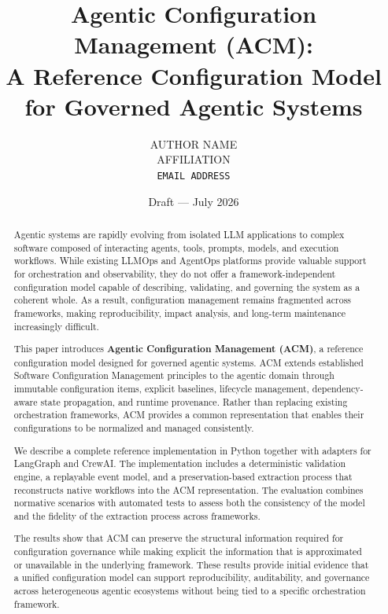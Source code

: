 \documentclass[10pt]{article}
\title{\textbf{Agentic Configuration Management (ACM):\\A Reference Configuration Model for Governed Agentic Systems}}
\author{
  AUTHOR NAME\\
  AFFILIATION\\
  \texttt{EMAIL ADDRESS}
}
\date{Draft --- July 2026}
\begin{document}
\maketitle

\begin{abstract}

Agentic systems are rapidly evolving from isolated LLM applications to complex software composed of interacting agents, tools, prompts, models, and execution workflows. While existing LLMOps and AgentOps platforms provide valuable support for orchestration and observability, they do not offer a framework-independent configuration model capable of describing, validating, and governing the system as a coherent whole. As a result, configuration management remains fragmented across frameworks, making reproducibility, impact analysis, and long-term maintenance increasingly difficult.

This paper introduces \textbf{Agentic Configuration Management (ACM)}, a reference configuration model designed for governed agentic systems. ACM extends established Software Configuration Management principles to the agentic domain through immutable configuration items, explicit baselines, lifecycle management, dependency-aware state propagation, and runtime provenance. Rather than replacing existing orchestration frameworks, ACM provides a common representation that enables their configurations to be normalized and managed consistently.

We describe a complete reference implementation in Python together with adapters for LangGraph and CrewAI. The implementation includes a deterministic validation engine, a replayable event model, and a preservation-based extraction process that reconstructs native workflows into the ACM representation. The evaluation combines normative scenarios with automated tests to assess both the consistency of the model and the fidelity of the extraction process across frameworks.

The results show that ACM can preserve the structural information required for configuration governance while making explicit the information that is approximated or unavailable in the underlying framework. These results provide initial evidence that a unified configuration model can support reproducibility, auditability, and governance across heterogeneous agentic ecosystems without being tied to a specific orchestration framework.

\end{abstract}
\end{document}
